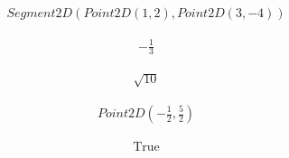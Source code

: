 \documentclass[letterpaper,10pt,english]{jupyterBook}
\begin{document}
\begin{sphinxVerbatim}[commandchars=\\\{\}]
 
\end{sphinxVerbatim}
\begin{equation*}
\begin{split}\displaystyle Segment2D\left(Point2D\left(1, 2\right), Point2D\left(3, -4\right)\right)\end{split}
\end{equation*}
\begin{sphinxVerbatim}[commandchars=\\\{\}]
  
 
\end{sphinxVerbatim}
\begin{equation*}
\begin{split}\displaystyle - \frac{1}{3}\end{split}
\end{equation*}
\begin{sphinxVerbatim}[commandchars=\\\{\}]
 
\end{sphinxVerbatim}
\begin{equation*}
\begin{split}\displaystyle \sqrt{10}\end{split}
\end{equation*}
\begin{sphinxVerbatim}[commandchars=\\\{\}]
 
\end{sphinxVerbatim}
\begin{equation*}
\begin{split}\displaystyle Point2D\left(- \frac{1}{2}, \frac{5}{2}\right)\end{split}
\end{equation*}
\begin{sphinxVerbatim}[commandchars=\\\{\}]
 
\end{sphinxVerbatim}
\begin{equation*}
\begin{split}\displaystyle \text{True}\end{split}
\end{equation*}
\end{document}
